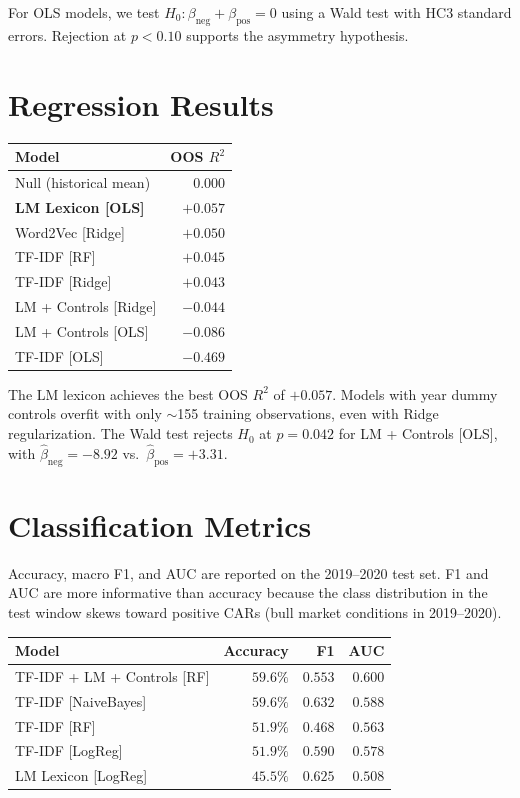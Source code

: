 \documentclass[12pt,a4paper]{article}
\begin{document}
For OLS models, we test $H_0: \beta_{\text{neg}} + \beta_{\text{pos}} = 0$ using a
Wald test with HC3 standard errors.  Rejection at $p < 0.10$ supports the asymmetry
hypothesis.

\section{Regression Results}

\begin{center}
\begin{tabular}{lr}
\toprule
Model & OOS $R^2$ \\
\midrule
Null (historical mean)      & $0.000$ \\
\textbf{LM Lexicon [OLS]}   & $\mathbf{+0.057}$ \\
Word2Vec [Ridge]             & $+0.050$ \\
TF-IDF [RF]                  & $+0.045$ \\
TF-IDF [Ridge]               & $+0.043$ \\
LM + Controls [Ridge]        & $-0.044$ \\
LM + Controls [OLS]          & $-0.086$ \\
TF-IDF [OLS]                 & $-0.469$ \\
\bottomrule
\end{tabular}
\end{center}

The LM lexicon achieves the best OOS $R^2$ of $+0.057$.  Models with year dummy
controls overfit with only $\sim$155 training observations, even with Ridge regularization.
The Wald test rejects $H_0$ at $p = 0.042$ for LM + Controls [OLS],
with $\hat\beta_{\text{neg}} = -8.92$ vs.\ $\hat\beta_{\text{pos}} = +3.31$.

\section{Classification Metrics}

Accuracy, macro F1, and AUC are reported on the 2019--2020 test set.
F1 and AUC are more informative than accuracy because the class distribution
in the test window skews toward positive CARs (bull market conditions in 2019--2020).

\begin{center}
\begin{tabular}{lrrr}
\toprule
Model & Accuracy & F1 & AUC \\
\midrule
TF-IDF + LM + Controls [RF] & $59.6\%$ & $0.553$ & $\mathbf{0.600}$ \\
TF-IDF [NaiveBayes]         & $\mathbf{59.6\%}$ & $0.632$ & $0.588$ \\
TF-IDF [RF]                  & $51.9\%$ & $0.468$ & $0.563$ \\
TF-IDF [LogReg]              & $51.9\%$ & $0.590$ & $0.578$ \\
LM Lexicon [LogReg]          & $45.5\%$ & $0.625$ & $0.508$ \\
\bottomrule
\end{tabular}
\end{center}
\end{document}
